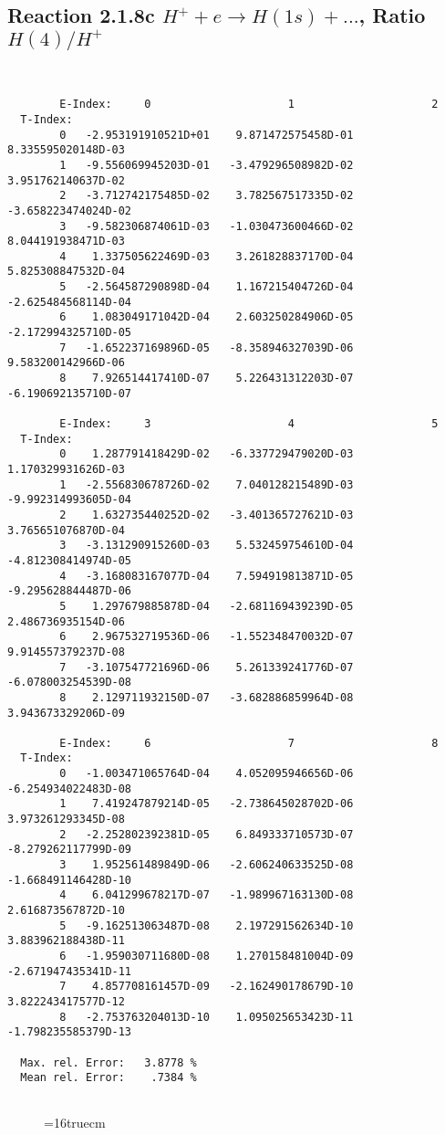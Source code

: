 \documentclass[12pt]{article}
\begin{document}
\subsection{
Reaction 2.1.8c  $H^+ + e \rightarrow H(1s) + ...$,  Ratio $H(4)/H^+$
}

\begin{small}\begin{verbatim}


        E-Index:     0                     1                     2
  T-Index:
        0   -2.953191910521D+01    9.871472575458D-01    8.335595020148D-03
        1   -9.556069945203D-01   -3.479296508982D-02    3.951762140637D-02
        2   -3.712742175485D-02    3.782567517335D-02   -3.658223474024D-02
        3   -9.582306874061D-03   -1.030473600466D-02    8.044191938471D-03
        4    1.337505622469D-03    3.261828837170D-04    5.825308847532D-04
        5   -2.564587290898D-04    1.167215404726D-04   -2.625484568114D-04
        6    1.083049171042D-04    2.603250284906D-05   -2.172994325710D-05
        7   -1.652237169896D-05   -8.358946327039D-06    9.583200142966D-06
        8    7.926514417410D-07    5.226431312203D-07   -6.190692135710D-07

        E-Index:     3                     4                     5
  T-Index:
        0    1.287791418429D-02   -6.337729479020D-03    1.170329931626D-03
        1   -2.556830678726D-02    7.040128215489D-03   -9.992314993605D-04
        2    1.632735440252D-02   -3.401365727621D-03    3.765651076870D-04
        3   -3.131290915260D-03    5.532459754610D-04   -4.812308414974D-05
        4   -3.168083167077D-04    7.594919813871D-05   -9.295628844487D-06
        5    1.297679885878D-04   -2.681169439239D-05    2.486736935154D-06
        6    2.967532719536D-06   -1.552348470032D-07    9.914557379237D-08
        7   -3.107547721696D-06    5.261339241776D-07   -6.078003254539D-08
        8    2.129711932150D-07   -3.682886859964D-08    3.943673329206D-09

        E-Index:     6                     7                     8
  T-Index:
        0   -1.003471065764D-04    4.052095946656D-06   -6.254934022483D-08
        1    7.419247879214D-05   -2.738645028702D-06    3.973261293345D-08
        2   -2.252802392381D-05    6.849333710573D-07   -8.279262117799D-09
        3    1.952561489849D-06   -2.606240633525D-08   -1.668491146428D-10
        4    6.041299678217D-07   -1.989967163130D-08    2.616873567872D-10
        5   -9.162513063487D-08    2.197291562634D-10    3.883962188438D-11
        6   -1.959030711680D-08    1.270158481004D-09   -2.671947435341D-11
        7    4.857708161457D-09   -2.162490178679D-10    3.822243417577D-12
        8   -2.753763204013D-10    1.095025653423D-11   -1.798235585379D-13

  Max. rel. Error:   3.8778 %
  Mean rel. Error:    .7384 %


\end{verbatim}\end{small}
\begin{figure} \label{2.1.8rc}
\epsfxsize=16truecm
\end{figure}
\newpage
\end{document}
